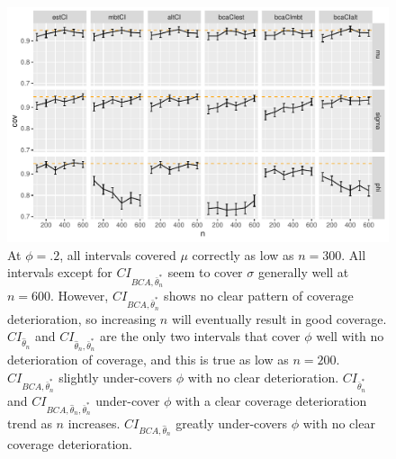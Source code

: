 \documentclass[12pt, letterpaper, titlepage]{article}
\begin{document}
\begin{figure}[tbp]
\caption{}
  \centering
  \includegraphics[width=\textwidth]{figures/plot_.2}
  \caption{At $\phi = .2$, all intervals covered $\mu$ correctly as low as $n = 300$. All intervals except for $CI_{BCA, \bar\theta_n^*}$ seem to cover $\sigma$ generally well at $n = 600$. However, $CI_{BCA, \bar\theta_n^*}$ shows no clear pattern of coverage deterioration, so increasing $n$ will eventually result in good coverage. $CI_{\hat{\theta}_{n}}$ and $CI_{\hat{\theta}_{n}, \bar\theta_n^*}$ are the only two intervals that cover $\phi$ well with no deterioration of coverage, and this is true as low as $n = 200$. $CI_{BCA, \bar\theta_n^*}$ slightly under-covers $\phi$ with no clear deterioration. $CI_{\bar\theta_n^*}$ and $CI_{BCA, \hat{\theta}_{n}, \bar\theta_n^*}$ under-cover $\phi$ with a clear coverage deterioration trend as $n$ increases. $CI_{BCA, \hat{\theta}_{n}}$ greatly under-covers $\phi$ with no clear coverage deterioration.}
  \label{fig:plot_.2}
\end{figure}
\end{document}
